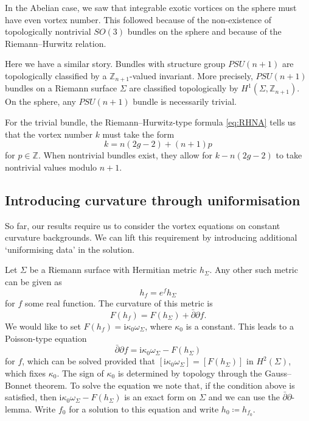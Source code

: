 \documentclass[10pt]{article}
\newcommand{\ii}{\text{i}}
\newcommand{\db}{\bar{\partial}}
\theoremstyle{definition}
\begin{document}
In the Abelian case, we saw that integrable exotic vortices on the sphere must have even vortex number. This followed because of the non-existence of topologically nontrivial \(SO(3)\) bundles on the sphere and because of the Riemann--Hurwitz relation.

Here we have a similar story. Bundles with structure group \(PSU(n+1)\) are topologically classified by a \(\mathbb{Z}_{n+1}\)-valued invariant. More precisely, \(PSU(n+1)\) bundles on a Riemann surface \(\Sigma\) are classified topologically by \(H^1(\Sigma, \mathbb{Z}_{n+1})\). On the sphere, any \(PSU(n+1)\) bundle is necessarily trivial. 

For the trivial bundle, the Riemann--Hurwitz-type formula \eqref{eq:RHNA} tells us that the vortex number \(k\) must take the form
\[
k = n(2g-2) + (n+1)p
\]
for \(p \in \mathbb{Z}\). 
When nontrivial bundles exist, they allow for \(k - n(2g-2)\) to take nontrivial values modulo \(n+1\). 


\subsection{Introducing curvature through uniformisation}

So far, our results require us to consider the vortex equations on constant curvature backgrounds. We can lift this requirement by introducing additional `uniformising data' in the solution. 

Let \(\Sigma\) be a Riemann surface with Hermitian metric \(h_\Sigma\). Any other such metric can be given as
\[
h_f = e^f h_\Sigma 
\]
for \(f\) some real function. 
The curvature of this metric is
\[
F(h_f) = F(h_\Sigma) +  \db\partial f \text{.}
\]
We would like to set \(F(h_f) = \ii \kappa_0 \omega_\Sigma\), where \(\kappa_0\) is a constant. This leads to a Poisson-type equation
\[
\db \partial f = \ii \kappa_0 \omega_\Sigma - F(h_\Sigma)
\]
for \(f\), which can be solved provided that \([\ii \kappa_0 \omega_\Sigma] = [F(h_\Sigma)]\) in \(H^2(\Sigma)\), which fixes \(\kappa_0\). The sign of \(\kappa_0\) is determined by topology through the Gauss--Bonnet theorem. To solve the equation we note that, if the condition above is satisfied, then \(\ii \kappa_0 \omega_\Sigma - F(h_\Sigma)\) is an exact form on \(\Sigma\) and we can use the \(\db \partial\)-lemma. Write \(f_0\) for a solution to this equation and write \(h_0 \coloneqq h_{f_0}\).
\end{document}
